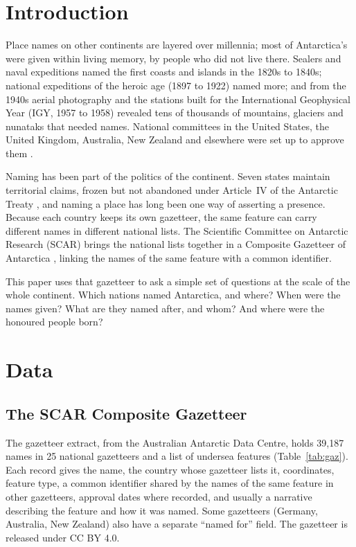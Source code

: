 \documentclass[11pt,a4paper]{article}
\begin{document}
\section{Introduction}
Place names on other continents are layered over millennia; most of Antarctica's were given within living memory, by people who did not live there. Sealers and naval expeditions named the first coasts and islands in the 1820s to 1840s; national expeditions of the heroic age (1897 to 1922) named more; and from the 1940s aerial photography and the stations built for the International Geophysical Year (IGY, 1957 to 1958) revealed tens of thousands of mountains, glaciers and nunataks that needed names. National committees in the United States, the United Kingdom, Australia, New Zealand and elsewhere were set up to approve them \citep{alberts,stewart}.

Naming has been part of the politics of the continent. Seven states maintain territorial claims, frozen but not abandoned under Article~IV of the Antarctic Treaty \citep{treaty}, and naming a place has long been one way of asserting a presence. Because each country keeps its own gazetteer, the same feature can carry different names in different national lists. The Scientific Committee on Antarctic Research (SCAR) brings the national lists together in a Composite Gazetteer of Antarctica \citep{scar}, linking the names of the same feature with a common identifier.

This paper uses that gazetteer to ask a simple set of questions at the scale of the whole continent. Which nations named Antarctica, and where? When were the names given? What are they named after, and whom? And where were the honoured people born?

\section{Data}
\subsection{The SCAR Composite Gazetteer}
The gazetteer extract, from the Australian Antarctic Data Centre, holds 39,187 names in 25 national gazetteers and a list of undersea features (Table~\ref{tab:gaz}). Each record gives the name, the country whose gazetteer lists it, coordinates, feature type, a common identifier shared by the names of the same feature in other gazetteers, approval dates where recorded, and usually a narrative describing the feature and how it was named. Some gazetteers (Germany, Australia, New Zealand) also have a separate ``named for'' field. The gazetteer is released under CC BY 4.0.
\end{document}
